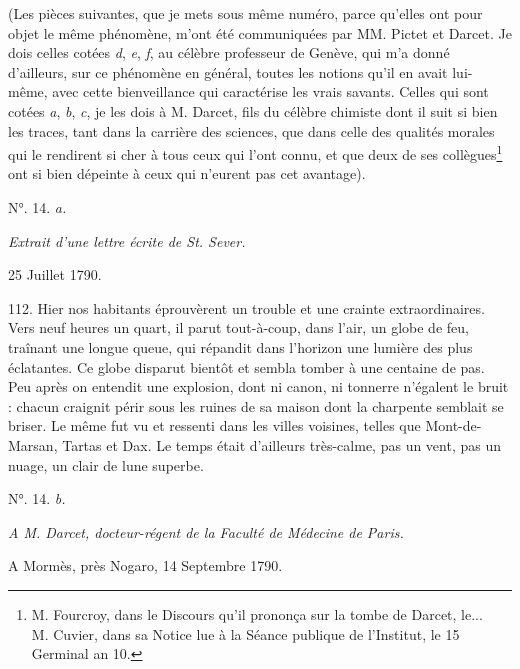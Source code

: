 \documentclass[a4paper, 11pt, oneside, polutonikogreek, french]{article}
\begin{document}
(Les pièces suivantes, que je mets sous même numéro, parce qu'elles ont pour objet le même phénomène, m'ont été communiquées par MM. Pictet et Darcet. Je dois celles cotées \emph{d}, \emph{e}, \emph{f}, au célèbre professeur de Genève, qui m'a donné d'ailleurs, sur ce phénomène en général, toutes les notions qu'il en avait lui-même, avec cette bienveillance qui caractérise les vrais savants. Celles qui sont cotées \emph{a}, \emph{b}, \emph{c}, je les dois à M. Darcet, fils du célèbre chimiste dont il suit si bien les traces, tant dans la carrière des sciences, que dans celle des qualités morales qui le rendirent si cher à tous ceux qui l'ont connu, et que deux de ses collègues\footnote{M. Fourcroy, dans le Discours qu'il prononça sur la tombe de Darcet, le...\\
M. Cuvier, dans sa Notice lue à la Séance publique de l'Institut, le 15 Germinal an 10.} ont si bien dépeinte à ceux qui n'eurent pas cet avantage).

\begin{center}
N°. 14. \emph{a.}
\end{center}

\begin{center}
\emph{Extrait d'une lettre écrite de St. Sever.}
\end{center}

25 Juillet 1790.

112. \og Hier nos habitants éprouvèrent un trouble et une crainte extraordinaires. Vers neuf heures un quart, il parut tout-à-coup, dans l'air, un globe de feu, traînant une longue queue, qui répandit dans l'horizon une lumière des plus éclatantes. Ce globe disparut bientôt et sembla tomber à une centaine de pas. Peu après on entendit une explosion, dont ni canon, ni tonnerre n'égalent le bruit : chacun craignit périr sous les ruines de sa maison dont la charpente semblait se briser. Le même fut vu et ressenti dans les villes voisines, telles que Mont-de-Marsan, Tartas et Dax. Le temps était d'ailleurs très-calme, pas un vent, pas un nuage, un clair de lune superbe. \fg

\begin{center}
N°. 14. \emph{b.}
\end{center}

\begin{center}
\emph{A M. Darcet, docteur-régent de la Faculté de Médecine de Paris.}
\end{center}

A Mormès, près Nogaro, 14 Septembre 1790.
\end{document}
